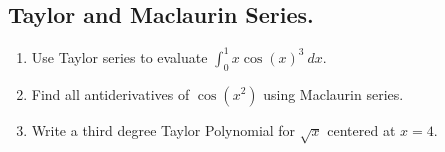 \documentclass{article}
\begin{document}
\subsection{Taylor and Maclaurin Series.}
\begin{enumerate}
\item Use Taylor series to evaluate $\displaystyle\int_0^1x\cos(x)^3\ dx$.
\item Find all antiderivatives of $\cos(x^2)$ using Maclaurin series.
\item Write a third degree Taylor Polynomial for $\sqrt{x}$ centered at $x = 4$.
\end{enumerate}
\end{document}
